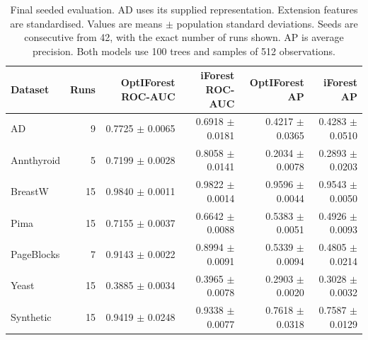 \begin{table}[t]\centering\small
\begin{tabular}{lrrrrr}\toprule
Dataset & Runs & OptIForest ROC-AUC & iForest ROC-AUC & OptIForest AP & iForest AP \\ \midrule
AD & 9 & 0.7725 $\pm$ 0.0065 & 0.6918 $\pm$ 0.0181 & 0.4217 $\pm$ 0.0365 & 0.4283 $\pm$ 0.0510 \\
Annthyroid & 5 & 0.7199 $\pm$ 0.0028 & 0.8058 $\pm$ 0.0141 & 0.2034 $\pm$ 0.0078 & 0.2893 $\pm$ 0.0203 \\
BreastW & 15 & 0.9840 $\pm$ 0.0011 & 0.9822 $\pm$ 0.0014 & 0.9596 $\pm$ 0.0044 & 0.9543 $\pm$ 0.0050 \\
Pima & 15 & 0.7155 $\pm$ 0.0037 & 0.6642 $\pm$ 0.0088 & 0.5383 $\pm$ 0.0051 & 0.4926 $\pm$ 0.0093 \\
PageBlocks & 7 & 0.9143 $\pm$ 0.0022 & 0.8994 $\pm$ 0.0091 & 0.5339 $\pm$ 0.0094 & 0.4805 $\pm$ 0.0214 \\
Yeast & 15 & 0.3885 $\pm$ 0.0034 & 0.3965 $\pm$ 0.0078 & 0.2903 $\pm$ 0.0020 & 0.3028 $\pm$ 0.0032 \\
Synthetic & 15 & 0.9419 $\pm$ 0.0248 & 0.9338 $\pm$ 0.0077 & 0.7618 $\pm$ 0.0318 & 0.7587 $\pm$ 0.0129 \\
\bottomrule\end{tabular}
\caption{Final seeded evaluation. AD uses its supplied representation. Extension features are standardised. Values are means $\pm$ population standard deviations. Seeds are consecutive from 42, with the exact number of runs shown. AP is average precision. Both models use 100 trees and samples of 512 observations.}\label{tab:results}
\end{table}
